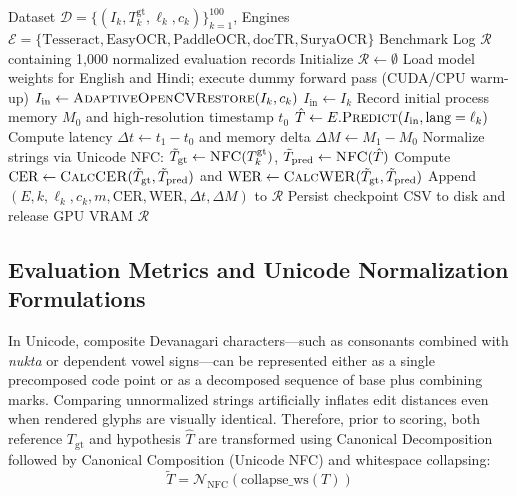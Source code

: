 \documentclass[11pt,a4paper]{article}
\begin{document}
\begin{algorithm}[H]
\caption{Dual-Pipeline Multilingual OCR Benchmarking Protocol}
\label{alg:benchmark}
\begin{algorithmic}[1]
\Require Dataset $\mathcal{D} = \{(I_k, T_k^{\text{gt}}, \ell_k, c_k)\}_{k=1}^{100}$, Engines $\mathcal{E} = \{\text{Tesseract}, \text{EasyOCR}, \text{PaddleOCR}, \text{docTR}, \text{SuryaOCR}\}$
\Ensure Benchmark Log $\mathcal{R}$ containing 1,000 normalized evaluation records
\State Initialize $\mathcal{R} \leftarrow \emptyset$
    \State Load model weights for English and Hindi; execute dummy forward pass (CUDA/CPU warm-up)
                \State $I_{\text{in}} \leftarrow \textsc{AdaptiveOpenCVRestore}(I_k, c_k)$
            \Else
                \State $I_{\text{in}} \leftarrow I_k$
            \EndIf
            \State Record initial process memory $M_0$ and high-resolution timestamp $t_0$
            \State $\hat{T} \leftarrow E.\textsc{Predict}(I_{\text{in}}, \text{lang}=\ell_k)$
            \State Compute latency $\Delta t \leftarrow t_1 - t_0$ and memory delta $\Delta M \leftarrow M_1 - M_0$
            \State Normalize strings via Unicode NFC: $\tilde{T}_{\text{gt}} \leftarrow \textsc{NFC}(T_k^{\text{gt}})$, $\tilde{T}_{\text{pred}} \leftarrow \textsc{NFC}(\hat{T})$
            \State Compute $\text{CER} \leftarrow \textsc{CalcCER}(\tilde{T}_{\text{gt}}, \tilde{T}_{\text{pred}})$ and $\text{WER} \leftarrow \textsc{CalcWER}(\tilde{T}_{\text{gt}}, \tilde{T}_{\text{pred}})$
            \State Append $(E, k, \ell_k, c_k, m, \text{CER}, \text{WER}, \Delta t, \Delta M)$ to $\mathcal{R}$
        \EndFor
    \EndFor
    \State Persist checkpoint CSV to disk and release GPU VRAM
\EndFor
\State \Return $\mathcal{R}$
\end{algorithmic}
\end{algorithm}

\subsection{Evaluation Metrics and Unicode Normalization Formulations}
In Unicode, composite Devanagari characters—such as consonants combined with \textit{nukta} or dependent vowel signs—can be represented either as a single precomposed code point or as a decomposed sequence of base plus combining marks. Comparing unnormalized strings artificially inflates edit distances even when rendered glyphs are visually identical. Therefore, prior to scoring, both reference $T_{\text{gt}}$ and hypothesis $\hat{T}$ are transformed using Canonical Decomposition followed by Canonical Composition (Unicode NFC) and whitespace collapsing:
\begin{equation}
    \tilde{T} = \mathcal{N}_{\text{NFC}}\!\left(\text{collapse\_ws}(T)\right)
\end{equation}
\end{document}
